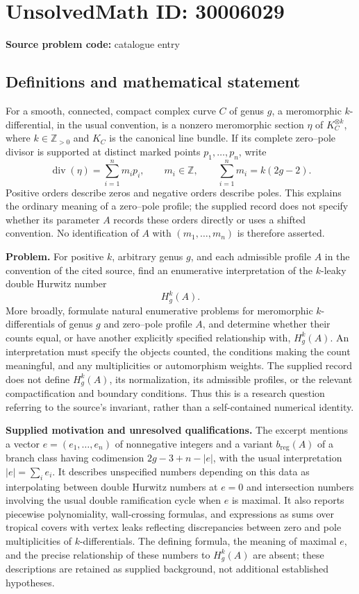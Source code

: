 \documentclass[11pt]{article}
\newcommand{\Z}{\mathbb{Z}}
\begin{document}
\section*{UnsolvedMath ID: 30006029}
\textbf{Source problem code:} catalogue entry
\subsection{Definitions and mathematical statement}
For a smooth, connected, compact complex curve \(C\) of genus \(g\), a meromorphic \(k\)-differential, in the usual convention, is a nonzero meromorphic section \(\eta\) of \(K_C^{\otimes k}\), where \(k\in\Z_{>0}\) and \(K_C\) is the canonical line bundle. If its complete zero--pole divisor is supported at distinct marked points \(p_1,\ldots,p_n\), write
\[
\operatorname{div}(\eta)=\sum_{i=1}^{n}m_i p_i,
\qquad m_i\in\Z,
\qquad \sum_{i=1}^{n}m_i=k(2g-2).
\]
Positive orders describe zeros and negative orders describe poles. This explains the ordinary meaning of a zero--pole profile; the supplied record does not specify whether its parameter \(A\) records these orders directly or uses a shifted convention. No identification of \(A\) with \((m_1,\ldots,m_n)\) is therefore asserted.

\textbf{Problem.} For positive \(k\), arbitrary genus \(g\), and each admissible profile \(A\) in the convention of the cited source, find an enumerative interpretation of the \(k\)-leaky double Hurwitz number
\[
H_g^k(A).
\]
More broadly, formulate natural enumerative problems for meromorphic \(k\)-differentials of genus \(g\) and zero--pole profile \(A\), and determine whether their counts equal, or have another explicitly specified relationship with, \(H_g^k(A)\). An interpretation must specify the objects counted, the conditions making the count meaningful, and any multiplicities or automorphism weights. The supplied record does not define \(H_g^k(A)\), its normalization, its admissible profiles, or the relevant compactification and boundary conditions. Thus this is a research question referring to the source's invariant, rather than a self-contained numerical identity.

\textbf{Supplied motivation and unresolved qualifications.} The excerpt mentions a vector \(e=(e_1,\ldots,e_n)\) of nonnegative integers and a variant \(b_{\mathrm{reg}}(A)\) of a branch class having codimension \(2g-3+n-|e|\), with the usual interpretation \(|e|=\sum_i e_i\). It describes unspecified numbers depending on this data as interpolating between double Hurwitz numbers at \(e=0\) and intersection numbers involving the usual double ramification cycle when \(e\) is maximal. It also reports piecewise polynomiality, wall-crossing formulas, and expressions as sums over tropical covers with vertex leaks reflecting discrepancies between zero and pole multiplicities of \(k\)-differentials. The defining formula, the meaning of maximal \(e\), and the precise relationship of these numbers to \(H_g^k(A)\) are absent; these descriptions are retained as supplied background, not additional established hypotheses.
\end{document}

